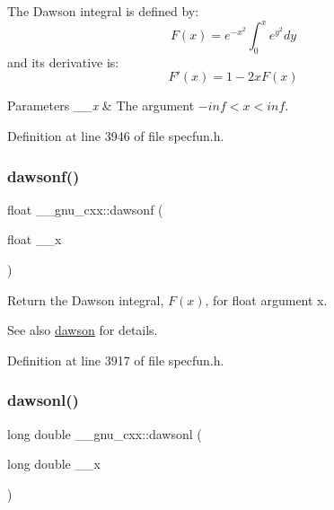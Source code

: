The Dawson integral is defined by\+: \[ F(x) = e^{-x^2}\int_0^x e^{y^2}dy \] and it\textquotesingle{}s derivative is\+: \[ F'(x) = 1 - 2xF(x) \]


\begin{DoxyParams}{Parameters}
{\em \+\_\+\+\_\+x} & The argument $ -inf < x < inf $. \\
\hline
\end{DoxyParams}


Definition at line 3946 of file specfun.\+h.

\mbox{\label{group__mathsf__gnu_ga0a1b8e6760b8c7869127d41d96209318}} 
\subsubsection{\texorpdfstring{dawsonf()}{dawsonf()}}
{\footnotesize\ttfamily float \+\_\+\+\_\+gnu\+\_\+cxx\+::dawsonf (\begin{DoxyParamCaption}\item[{float}]{\+\_\+\+\_\+x }\end{DoxyParamCaption})\hspace{0.3cm}{\ttfamily [inline]}}

Return the Dawson integral, $ F(x) $, for {\ttfamily float} argument {\ttfamily x}.

\begin{DoxySeeAlso}{See also}
\hyperlink{group__mathsf__gnu_gabc97cbc04fdd23593e8dccbc1421dad5}{dawson} for details. 
\end{DoxySeeAlso}


Definition at line 3917 of file specfun.\+h.

\mbox{\label{group__mathsf__gnu_ga6647a7444ff9c7c1f2a8ed36761bfeb2}} 
\subsubsection{\texorpdfstring{dawsonl()}{dawsonl()}}
{\footnotesize\ttfamily long double \+\_\+\+\_\+gnu\+\_\+cxx\+::dawsonl (\begin{DoxyParamCaption}\item[{long double}]{\+\_\+\+\_\+x }\end{DoxyParamCaption})\hspace{0.3cm}{\ttfamily [inline]}}

